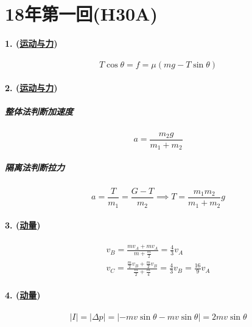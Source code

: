 
\section{18年第一回(H30A)}

\paragraph{1. (\hyperref[subsec:运动与力]{运动与力})}

\begin{equation*}
    T\cos\theta=f=\mu(mg-T\sin\theta)
\end{equation*}

\paragraph{2. (\hyperref[subsec:运动与力]{运动与力})}

\subparagraph{整体法判断加速度}

\begin{equation*}
    a=\frac{m_2g}{m_1+m_2}
\end{equation*}

\subparagraph{隔离法判断拉力}

\begin{equation*}
    a=\frac{T}{m_1}=\frac{G-T}{m_2}\implies
    T=\frac{m_1m_2}{m_1+m_2}g
\end{equation*}

\paragraph{3. (\hyperref[subsec:动量]{动量})}

\begin{gather*}
    v_B=\frac{mv_A+mv_A}{m+\frac{m}{2}}=\frac43v_A\\
    v_C=\frac{\frac{m}{2}v_B+\frac{m}{2}v_B}{\frac{m}{2}+\frac{m}{4}}=\frac43v_B=\frac{16}{9}v_A
\end{gather*}

\paragraph{4. (\hyperref[subsec:动量]{动量})}

\begin{equation*}
    |I|=|\Delta p|=|-mv\sin\theta-mv\sin\theta|=2mv\sin\theta
\end{equation*}

